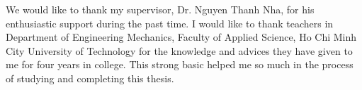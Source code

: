 \begin{acknowledgements}
    \addchaptertocentry{\acknowledgementname} %
    We would like to thank my supervisor, Dr. Nguyen Thanh Nha, for his enthusiastic support
during the past time. I would like to thank teachers in Department of Engineering
Mechanics, Faculty of Applied Science, Ho Chi Minh City University of Technology for
the knowledge and advices they have given to me for four years in college. This strong
basic helped me so much in the process of studying and completing this thesis.

    \end{acknowledgements}